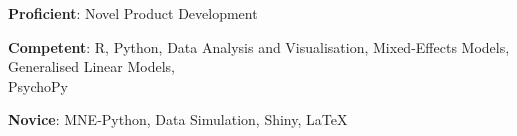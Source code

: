 \textbf{Proficient}: \phantom{:} Novel Product Development

\textbf{Competent}: R, Python, Data Analysis and Visualisation, Mixed-Effects Models, Generalised Linear Models, \\
 PsychoPy

\textbf{Novice}:  MNE-Python, Data Simulation, Shiny, LaTeX

